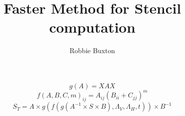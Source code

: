 \documentclass{article}
\begin{document}
\title{Faster Method for Stencil computation}
\author{Robbie Buxton}
\maketitle
\[g(A) = XAX \]
\[f(A,B,C,m)_{ij} = A_{ij}(B_{ii} + C_{jj})^m \]
\[ S_T =  A \times g(f(g(A^{-1} \times S \times B),\Lambda_V,\Lambda_H,t)) \times B^{-1} \]
\end{document}

